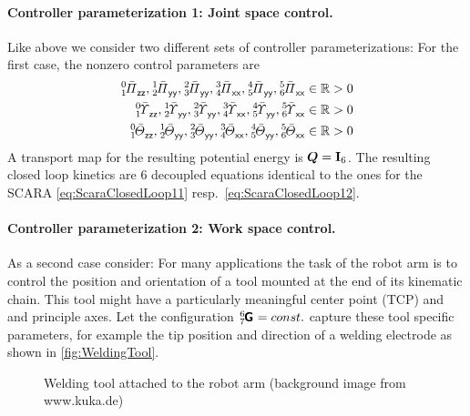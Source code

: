 \paragraph{Controller parameterization 1: Joint space control.}
Like above we consider two different sets of controller parameterizations: 
For the first case, the nonzero control parameters are
\begin{align}
 \bodyMOSCoeffC{0}{1}{\idxZ\idxZ}, \bodyMOSCoeffC{1}{2}{\idxY\idxY}, \bodyMOSCoeffC{2}{3}{\idxY\idxY}, \bodyMOSCoeffC{3}{4}{\idxX\idxX}, \bodyMOSCoeffC{4}{5}{\idxY\idxY}, \bodyMOSCoeffC{5}{6}{\idxX\idxX} &\in \RealNum > 0
\nonumber\\
 \bodyMODCoeffC{0}{1}{\idxZ\idxZ}, \bodyMODCoeffC{1}{2}{\idxY\idxY}, \bodyMODCoeffC{2}{3}{\idxY\idxY}, \bodyMODCoeffC{3}{4}{\idxX\idxX}, \bodyMODCoeffC{4}{5}{\idxY\idxY}, \bodyMODCoeffC{5}{6}{\idxX\idxX} &\in \RealNum > 0
\nonumber\\
 \bodyMOICoeffC{0}{1}{\idxZ\idxZ}, \bodyMOICoeffC{1}{2}{\idxY\idxY}, \bodyMOICoeffC{2}{3}{\idxY\idxY}, \bodyMOICoeffC{3}{4}{\idxX\idxX}, \bodyMOICoeffC{4}{5}{\idxY\idxY}, \bodyMOICoeffC{5}{6}{\idxX\idxX} &\in \RealNum > 0
\end{align}
A transport map for the resulting potential energy is $\sysTransportMap = \idMat[6]$.
The resulting closed loop kinetics are 6 decoupled equations identical to the ones for the SCARA \eqref{eq:ScaraClosedLoop11} resp.\ \eqref{eq:ScaraClosedLoop12}.

\paragraph{Controller parameterization 2: Work space control.}
As a second case consider: For many applications the task of the robot arm is to control the position and orientation of a tool mounted at the end of its kinematic chain.
This tool might have a particularly meaningful center point (TCP) and and principle axes.
Let the configuration $\bodyHomoCoord{6}{7} = \const$ capture these tool specific parameters, for example the tip position and direction of a welding electrode as shown in \autoref{fig:WeldingTool}.

\begin{figure}[ht]
 \centering
 
 \caption{Welding tool attached to the robot arm (background image from www.kuka.de)}
 \label{fig:WeldingTool}
\end{figure}

